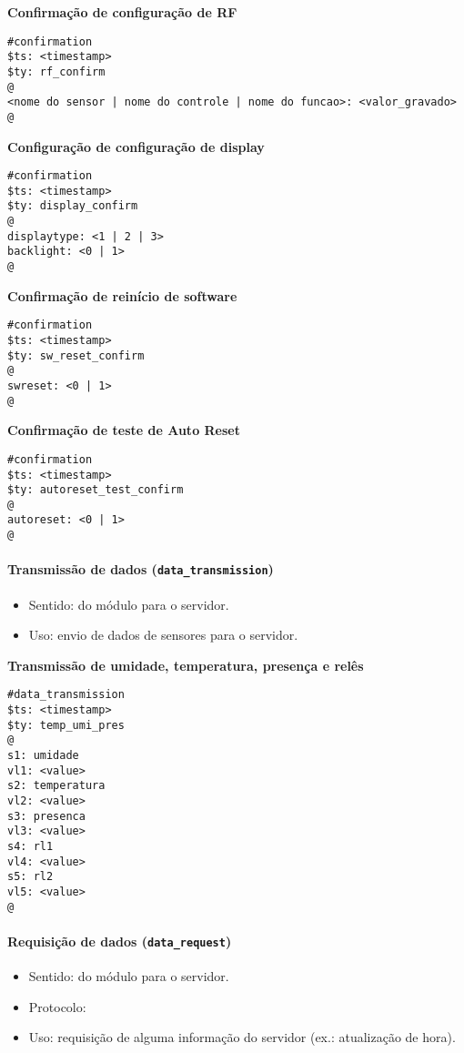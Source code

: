 \textbf{Confirmação de configuração de RF}
\begin{lstlisting}
#confirmation
$ts: <timestamp>
$ty: rf_confirm
@
<nome do sensor | nome do controle | nome do funcao>: <valor_gravado>
@
\end{lstlisting}

\textbf{Configuração de configuração de display}
\begin{lstlisting}
#confirmation
$ts: <timestamp>
$ty: display_confirm
@
displaytype: <1 | 2 | 3>
backlight: <0 | 1>
@
\end{lstlisting}

\textbf{Confirmação de reinício de software}
\begin{lstlisting}
#confirmation
$ts: <timestamp>
$ty: sw_reset_confirm
@
swreset: <0 | 1>
@
\end{lstlisting}

\textbf{Confirmação de teste de Auto Reset}
\begin{lstlisting}
#confirmation
$ts: <timestamp>
$ty: autoreset_test_confirm
@
autoreset: <0 | 1>
@
\end{lstlisting}

\paragraph{Transmissão de dados (\texttt{data\_transmission})}
\begin{itemize}
\item Sentido: do módulo para o servidor.
\item Uso: envio de dados de sensores para o servidor.
\end{itemize}

\textbf{Transmissão de umidade, temperatura, presença e relês}
\begin{lstlisting}
#data_transmission
$ts: <timestamp>
$ty: temp_umi_pres
@
s1: umidade
vl1: <value>
s2: temperatura
vl2: <value>
s3: presenca
vl3: <value>
s4: rl1
vl4: <value>
s5: rl2
vl5: <value>
@
\end{lstlisting}

\paragraph{Requisição de dados (\texttt{data\_request})}
\begin{itemize}
\item Sentido: do módulo para o servidor.
\item Protocolo: \wmqtt{}
\item Uso: requisição de alguma informação do servidor (ex.: atualização de hora).
\end{itemize}


